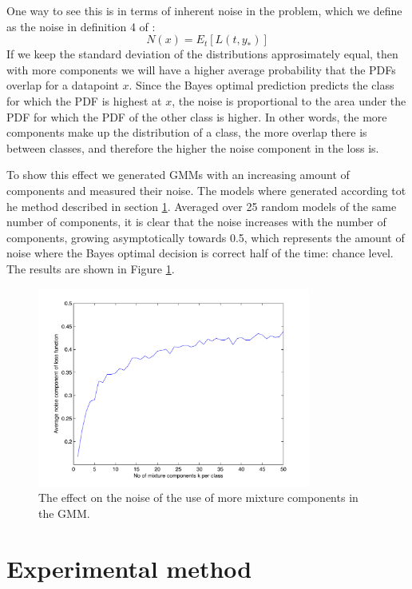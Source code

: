 \documentclass[a4paper]{article}
\begin{document}
One way to see this is in terms of inherent noise in the problem, which we define as the noise in definition 4 of \cite{Domingos2000}:
\begin{equation}
\label{eq:noise}
N(x) = E_t[L(t,y_*)]
\end{equation}
If we keep the standard deviation of the distributions approsimately equal, then with more components we will have a higher average probability that the \ac{PDF}s overlap for a datapoint $x$. Since the Bayes optimal prediction predicts the class for which the \ac{PDF} is highest at $x$, the noise is proportional to the area under the \ac{PDF} for which the \ac{PDF} of the other class is higher. In other words, the more components make up the distribution of a class, the more overlap there is between classes, and therefore the higher the noise component in the loss is.

To show this effect we generated \ac{GMM}s with an increasing amount of components and measured their noise. The models where generated according tot he method described in section \ref{sec:experimental_method}. Averaged over 25 random models of the same number of components, it is clear that the noise increases with the number of components, growing asymptotically towards 0.5, which represents the amount of noise where the Bayes optimal decision is correct half of the time: chance level. The results are shown in Figure \ref{fig:noisepercomp}.

\begin{figure}[htb]
    \centering
    \includegraphics[width=0.8\textwidth]{noise_per_k.pdf}
    \caption{The effect on the noise of the use of more mixture components in the \ac{GMM}. \label{fig:noisepercomp}}
\end{figure}

\section{Experimental method}
\label{sec:experimental_method}
\end{document}
